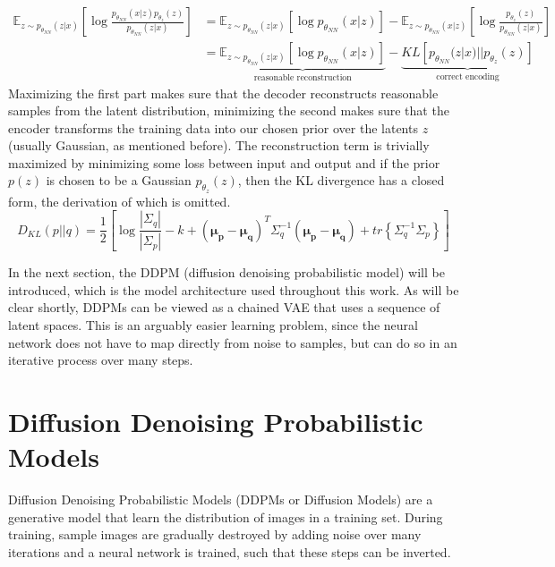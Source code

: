 \begin{align}
    \mathbb{E}_{z\sim p_{\theta_{NN}}(z|x)}\left[\log\frac{p_{\theta_{NN}}(x|z) p_{\theta_z}(z)}{p_{\theta_{NN}}(z|x)}\right] & = \mathbb{E}_{z\sim p_{\theta_{NN}}(z|x)}\left[\log p_{\theta_{NN}}(x|z)\right] - \mathbb{E}_{z\sim p_{\theta_{NN}}(x|z)}\left[\log \frac{p_{\theta_{z}}(z)}{p_{\theta_{NN}}(z|x)}\right]                                        \\
                                                                                                                              & = \underbrace{\mathbb{E}_{z\sim p_{\theta_{NN}}(z|x)}\left[\log p_{\theta_{NN}}(x|z)\right]}_{\text{reasonable reconstruction}} - \underbrace{KL \left[p_{\theta_{NN}}(z|x)||p_{\theta_{z}}(z)\right]}_{\text{correct encoding}}
\end{align}
Maximizing the first part makes sure that the decoder reconstructs reasonable samples from the latent distribution, minimizing the second makes sure that the encoder transforms the training data into our chosen prior over the latents $z$ (usually Gaussian, as mentioned before). The reconstruction term is trivially maximized by minimizing some loss between input and output and if the prior $p(z)$ is chosen to be a Gaussian $p_{\theta_{z}}(z)$, then the KL divergence has a closed form, the derivation of which is omitted.~\autocite{mreasykldivergence}
\begin{equation}
    D_{KL}(p||q) = \frac{1}{2}\left[\log\frac{|\Sigma_q|}{|\Sigma_p|} - k + (\boldsymbol{\mu_p}-\boldsymbol{\mu_q})^T\Sigma_q^{-1}(\boldsymbol{\mu_p}-\boldsymbol{\mu_q}) + tr\left\{\Sigma_q^{-1}\Sigma_p\right\}\right]
\end{equation}

In the next section, the DDPM (diffusion denoising probabilistic model) will be introduced, which is the model architecture used throughout this work. As will be clear shortly, DDPMs can be viewed as a chained VAE that uses a sequence of latent spaces. This is an arguably easier learning problem, since the neural network does not have to map directly from noise to samples, but can do so in an iterative process over many steps.

\section{Diffusion Denoising Probabilistic Models}
Diffusion Denoising Probabilistic Models (DDPMs or Diffusion Models) are a generative model that learn the distribution of images in a training set. During training, sample images are gradually destroyed by adding noise over many iterations and a neural network is trained, such that these steps can be inverted.


